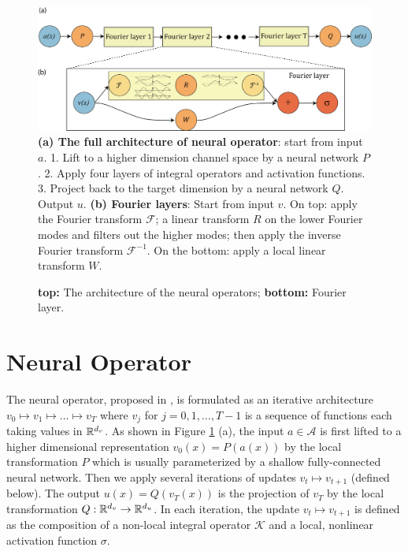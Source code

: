 \documentclass{article} %
\newcommand{\A}{\mathcal{A}}
\newcommand{\cG}{\mathcal{F}}
\newcommand{\cK}{\mathcal{K}}
\begin{document}

\begin{figure}
    \centering
    \includegraphics[width=14cm]{figs/fourier_full_arch5.png}\\
    \small{
    {\bf (a) The full architecture of neural operator}: start from input $a$. 1. Lift to a higher dimension channel space by a neural network $P$. 2. Apply four layers of integral operators and activation functions. 3. Project back to the target dimension by a neural network $Q$. Output $u$.
    {\bf (b) Fourier layers}: Start from input $v$. On top: apply the Fourier transform $\cG$; a linear transform $R$ on the lower Fourier modes and filters out the higher modes; then apply the inverse Fourier transform $\cG^{-1}$. On the bottom: apply a local linear transform $W$.
    }
    \caption{ {\bf top:} The architecture of the neural operators; \textbf{bottom:} Fourier layer.}
    \label{fig:arch}
\end{figure}

\section{Neural Operator}
The neural operator, proposed in \citep{li2020neural}, is formulated as an iterative architecture $v_0 \mapsto v_1 \mapsto \ldots \mapsto v_T$ where $v_j$ for $j=0,1,\dots,T-1$
is a sequence of functions each taking values in $\mathbb{R}^{d_v}$. As shown in Figure \ref{fig:arch} (a), the input \(a \in \A\) is first lifted to a higher dimensional representation $v_0(x) = P(a(x))$ by the local transformation \(P\) which is usually parameterized by a shallow fully-connected neural network. Then we apply several iterations of updates $v_t \mapsto v_{t+1}$ (defined below). The output $u(x) = Q(v_T(x))$ is the projection of $v_T$ by the local transformation $Q: \mathbb{R}^{d_v} \to \mathbb{R}^{d_u}$. In each iteration, the update $v_t \mapsto v_{t+1}$ is defined as the composition of a non-local integral operator $\cK$ and a local, nonlinear activation function $\sigma$.
\end{document}
